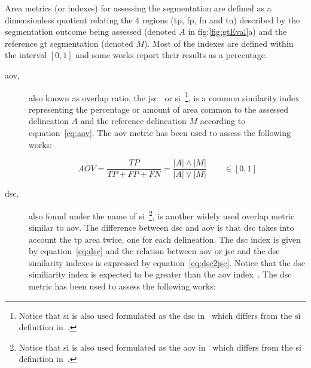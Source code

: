 \vspace{15pt}
Area metrics (or indexes) for assessing the segmentation are defined as a dimensionless quotient relating the 4 regions (\ac{tp}, \ac{fp}, \ac{fn} and \ac{tn}) described by the segmentation outcome being assessed (denoted $A$ in fig:\ref{fig:gtEval}a) and the reference \ac{gt} segmentation (denoted $M$). Most of the indexes are defined within the interval $[0,1]$ and some works report their results as a percentage.

\begin{description}

\item[\acf{aov},] also known as overlap ratio, the \ac{jsc}~\cite{Gao:2012p14336} or \ac{si}~\cite{Shan:2012p14347}\footnote{Notice that \acf{si} is also used formulated as the \acf{dsc} in~\cite{Huang:2007p6100,Huang:2005p11636} which differs from the \ac{si} definition in~\cite{Shan:2012p14347}.}, is a common similarity index representing the percentage or amount of area common to the assessed delineation $A$ and the reference delineation $M$ according to equation~\ref{eq:aov}. 
The \ac{aov} metric has been used to assess the following works: \cite{Horsch:2001p6028,Gomez:2010p14339,AlemanFlores:2007p14310,Cui:2009p14325,massich2010lesion,Shan:2012p14347,hao2012combining,Liu:2010p14328}

\begin{equation}\label{eq:aov}
AOV = \frac{TP}{TP+FP+FN}=\frac{|A| \wedge |M|}{|A| \vee |M|} \qquad \in [0,1]
\end{equation}

\item[\acf{dsc},]
also found under the name of \ac{si}~\cite{Huang:2007p6100,Huang:2005p11636}\footnote{Notice that \acf{si} is also used formulated as the \acf{aov} in~\cite{Shan:2012p14347} which differs from the \ac{si} definition in~\cite{Huang:2007p6100,Huang:2005p11636}.},
is another widely used overlap metric similar to \ac{aov}. The difference between \ac{dsc} and \ac{aov} is that \ac{dsc} takes into account the \ac{tp} area twice, one for each delineation. 
The \ac{dsc} index is given by equation~\ref{eq:dsc} and the relation between \ac{aov} or \ac{jsc} and the \ac{dsc} similarity indexes is expressed by equation~\ref{eq:dsc2jsc}. Notice that the \ac{dsc} similiarity index is expected to be greater than the \ac{aov} index~\cite{gerard2013}. The \ac{dsc} metric has been used to assess the following works:\cite{gerard2013,Huang:2007p6100,Zhang:2010p14317,Huang:2005p11636}


\end{description}
